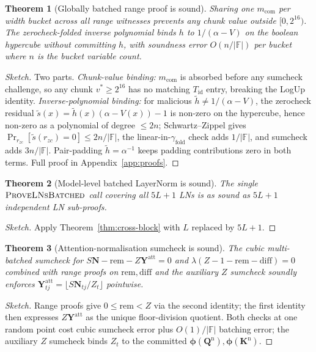 \documentclass[letterpaper,twocolumn,10pt]{article}
\newtheorem{theorem}{Theorem}
\theoremstyle{remark}
\theoremstyle{definition}
\newcommand{\FF}{\mathbb{F}}
\newcommand{\bphi}{\boldsymbol{\phi}}
\newcommand{\bN}{\mathbf{N}}
\newcommand{\bY}{\mathbf{Y}}
\newcommand{\bQ}{\mathbf{Q}}
\newcommand{\bK}{\mathbf{K}}
\begin{document}
\begin{theorem}[Globally batched range proof is sound]
\label{thm:range}
Sharing one $m_{\mathrm{com}}$ per width bucket across all range
witnesses prevents any chunk value outside $[0,2^{16})$. The
zerocheck-folded inverse polynomial binds $h$ to $1/(\alpha\!-\!V)$
on the boolean hypercube \emph{without} committing $h$, with
soundness error $O(n/|\FF|)$ per bucket where $n$ is the bucket
variable count.
\end{theorem}
\begin{proof}[Sketch]
Two parts. \emph{Chunk-value binding:} $m_{\mathrm{com}}$ is absorbed
before any sumcheck challenge, so any chunk $v^*\!\ge\!2^{16}$ has no
matching $T_{\mathrm{id}}$ entry, breaking the LogUp identity.
\emph{Inverse-polynomial binding:} for malicious
$\tilde h\!\ne\!1/(\alpha\!-\!V)$, the zerocheck residual
$\tilde s(x)\!=\!\tilde h(x)(\alpha\!-\!V(x))\!-\!1$ is non-zero on
the hypercube, hence non-zero as a polynomial of degree $\le 2n$;
Schwartz--Zippel gives $\Pr_{r_{zc}}[\tilde s(r_{zc})\!=\!0]\!\le\!2n/|\FF|$,
the linear-in-$\gamma_{\mathrm{fold}}$ check adds $1/|\FF|$, and
sumcheck adds $3n/|\FF|$. Pair-padding $\tilde h\!=\!\alpha^{-1}$
keeps padding contributions zero in both terms. Full proof in
Appendix~\ref{app:proofs}.
\end{proof}

\begin{theorem}[Model-level batched LayerNorm is sound]
\label{thm:lnbatch}
The single $\textsc{ProveLNsBatched}$ call covering all $5L\!+\!1$
LNs is as sound as $5L\!+\!1$ independent LN sub-proofs.
\end{theorem}
\begin{proof}[Sketch]
Apply Theorem~\ref{thm:cross-block} with $L$ replaced by $5L\!+\!1$.
\end{proof}

\begin{theorem}[Attention-normalisation sumcheck is sound]
\label{thm:attnnorm}
The cubic multi-batched sumcheck for
$S\bN\!-\!\mathrm{rem}\!-\!Z\bY^{\mathrm{att}}\!=\!0$ and
$\lambda(Z\!-\!1\!-\!\mathrm{rem}\!-\!\mathrm{diff})\!=\!0$ combined
with range proofs on $\mathrm{rem},\mathrm{diff}$ and the auxiliary
$Z$ sumcheck soundly enforces
$\bY^{\mathrm{att}}_{tj}\!=\!\lfloor S\bN_{tj}/Z_t\rfloor$ pointwise.
\end{theorem}
\begin{proof}[Sketch]
Range proofs give $0\!\le\!\mathrm{rem}\!<\!Z$ via the second identity;
the first identity then expresses $Z\bY^{\mathrm{att}}$ as the unique
floor-division quotient. Both checks at one random point cost cubic
sumcheck error plus $O(1)/|\FF|$ batching error; the auxiliary $Z$
sumcheck binds $Z_t$ to the committed
$\bphi(\bQ^{\mathrm n}),\bphi(\bK^{\mathrm n})$.
\end{proof}
\end{document}
